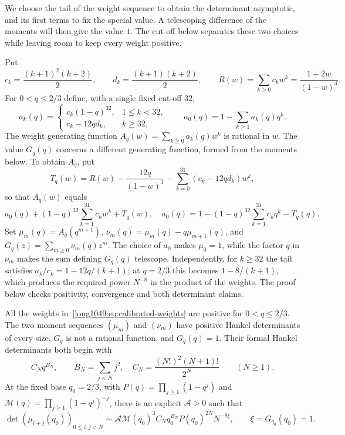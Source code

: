 We choose the tail of the weight sequence to obtain the determinant
asymptotic, and its first terms to fix the special value. A telescoping
difference of the moments will then give the value $1$. The cut-off
below separates these two choices while leaving room to keep every
weight positive.

Put
\[
 c_k=\frac{(k+1)^2(k+2)}2,\qquad
 d_k=\frac{(k+1)(k+2)}2,\qquad
 R(w)=\sum_{k\ge0}c_kw^k=\frac{1+2w}{(1-w)^4}.
\]
For $0<q\le2/3$ define, with a single fixed cut-off $32$,
\begin{equation}\label{long1049:eq:calibrated-weights}
 a_k(q)=\begin{cases}
 c_k(1-q)^{32},&1\le k<32,\\
 c_k-12q d_k,&k\ge32,
 \end{cases}
 \qquad a_0(q)=1-\sum_{k\ge1}a_k(q)q^k.
\end{equation}
The weight generating function $A_q(w)=\sum_{k\ge0}a_k(q)w^k$
is rational in $w$. The value $G_q(q)$ concerns a different
generating function, formed from the moments below. To obtain $A_q$, put
\[
 T_q(w)=R(w)-\frac{12q}{(1-w)^3}
            -\sum_{k=0}^{31}(c_k-12qd_k)w^k,
\]
so that $A_q(w)$ equals
\[
 a_0(q)+(1-q)^{32}\sum_{k=1}^{31}c_kw^k+T_q(w),\quad
 a_0(q)=1-(1-q)^{32}\sum_{k=1}^{31}c_kq^k-T_q(q).
\]
Set $\mu_m(q)=A_q(q^{m+1})$, $\nu_m(q)=\mu_m(q)-q\mu_{m+1}(q)$,
and $G_q(z)=\sum_{m\ge0}\nu_m(q)z^m$.
The choice of $a_0$ makes $\mu_0=1$, while the factor $q$ in
$\nu_m$ makes the sum defining $G_q(q)$ telescope. Independently,
for $k\ge32$ the tail satisfies $a_k/c_k=1-12q/(k+1)$;
at $q=2/3$ this becomes $1-8/(k+1)$, which produces the required
power $N^{-8}$ in the product of the weights. The proof below checks
positivity, convergence and both determinant claims.

\begin{remark}
\label{long1049:thm:calibrated-model}
All the weights in~\eqref{long1049:eq:calibrated-weights} are positive
for $0<q\le2/3$. The two moment sequences $(\mu_m)$ and $(\nu_m)$
have positive Hankel determinants of every size, $G_q$ is not a rational
function, and
$G_q(q)=1$.  Their formal Hankel determinants both begin with
\[
 C_Nq^{B_N},\qquad B_N=\sum_{j<N}j^2,\quad
 C_N=\frac{(N!)^2(N+1)!}{2^N}\qquad(N\ge1).
\]
At the fixed base $q_0=2/3$, with
$P(q)=\prod_{j\ge1}(1-q^j)$ and
$\mathcal M(q)=\prod_{j\ge1}(1-q^j)^{-j}$,
there is an explicit $\mathcal A>0$ such that
\[
 \det(\mu_{i+j}(q_0))_{0\le i,j<N}
 \sim\mathcal A\mathcal M(q_0)^3 C_Nq_0^{B_N}
             P(q_0)^{2N}N^{-8\xi},\qquad \xi=G_{q_0}(q_0)=1.
\]
\end{remark}


